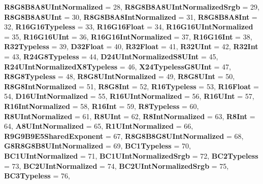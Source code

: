 \begin{DoxyCompactItemize}
{\bfseries R8\+G8\+B8\+A8\+U\+Int\+Normalized} = 28, 
\newline
{\bfseries R8\+G8\+B8\+A8\+U\+Int\+Normalized\+Srgb} = 29, 
{\bfseries R8\+G8\+B8\+A8\+U\+Int} = 30, 
{\bfseries R8\+G8\+B8\+A8\+Int\+Normalized} = 31, 
{\bfseries R8\+G8\+B8\+A8\+Int} = 32, 
\newline
{\bfseries R16\+G16\+Typeless} = 33, 
{\bfseries R16\+G16\+Float} = 34, 
{\bfseries R16\+G16\+U\+Int\+Normalized} = 35, 
{\bfseries R16\+G16\+U\+Int} = 36, 
\newline
{\bfseries R16\+G16\+Int\+Normalized} = 37, 
{\bfseries R16\+G16\+Int} = 38, 
{\bfseries R32\+Typeless} = 39, 
{\bfseries D32\+Float} = 40, 
\newline
{\bfseries R32\+Float} = 41, 
{\bfseries R32\+U\+Int} = 42, 
{\bfseries R32\+Int} = 43, 
{\bfseries R24\+G8\+Typeless} = 44, 
\newline
{\bfseries D24\+U\+Int\+Normalized\+S8\+U\+Int} = 45, 
{\bfseries R24\+U\+Int\+Normalized\+X8\+Typeless} = 46, 
{\bfseries X24\+Typeless\+G8\+U\+Int} = 47, 
{\bfseries R8\+G8\+Typeless} = 48, 
\newline
{\bfseries R8\+G8\+U\+Int\+Normalized} = 49, 
{\bfseries R8\+G8\+U\+Int} = 50, 
{\bfseries R8\+G8\+Int\+Normalized} = 51, 
{\bfseries R8\+G8\+Int} = 52, 
\newline
{\bfseries R16\+Typeless} = 53, 
{\bfseries R16\+Float} = 54, 
{\bfseries D16\+U\+Int\+Normalized} = 55, 
{\bfseries R16\+U\+Int\+Normalized} = 56, 
\newline
{\bfseries R16\+U\+Int} = 57, 
{\bfseries R16\+Int\+Normalized} = 58, 
{\bfseries R16\+Int} = 59, 
{\bfseries R8\+Typeless} = 60, 
\newline
{\bfseries R8\+U\+Int\+Normalized} = 61, 
{\bfseries R8\+U\+Int} = 62, 
{\bfseries R8\+Int\+Normalized} = 63, 
{\bfseries R8\+Int} = 64, 
\newline
{\bfseries A8\+U\+Int\+Normalized} = 65, 
{\bfseries R1\+U\+Int\+Normalized} = 66, 
{\bfseries R9\+G9\+B9\+E5\+Shared\+Exponent} = 67, 
{\bfseries R8\+G8\+B8\+G8\+U\+Int\+Normalized} = 68, 
\newline
{\bfseries G8\+R8\+G8\+B8\+U\+Int\+Normalized} = 69, 
{\bfseries B\+C1\+Typeless} = 70, 
{\bfseries B\+C1\+U\+Int\+Normalized} = 71, 
{\bfseries B\+C1\+U\+Int\+Normalized\+Srgb} = 72, 
\newline
{\bfseries B\+C2\+Typeless} = 73, 
{\bfseries B\+C2\+U\+Int\+Normalized} = 74, 
{\bfseries B\+C2\+U\+Int\+Normalized\+Srgb} = 75, 
{\bfseries B\+C3\+Typeless} = 76, 
\newline

\end{DoxyCompactItemize}
